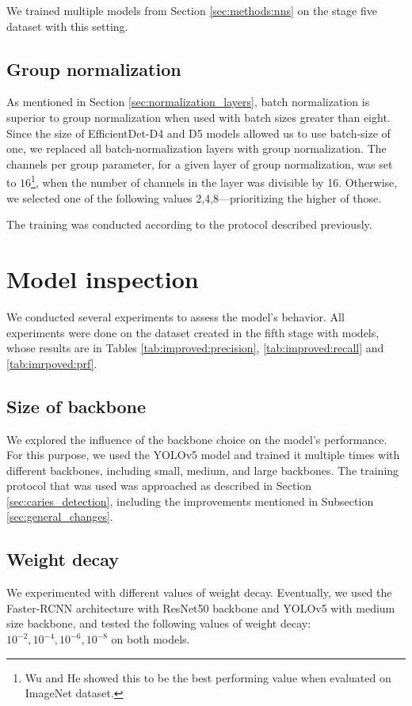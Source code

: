 We trained multiple models from Section \ref{sec:methods:nns} on the stage five dataset with this setting.

\subsection{Group normalization}
\label{sec:methods:group_norm}
As mentioned in Section \ref{sec:normalization_layers}, batch normalization is superior to group normalization when used with batch sizes greater than eight. Since the size of EfficientDet-D4 and D5  models allowed us to use batch-size of one, we replaced all batch-normalization layers with group normalization. The channels per group parameter, for a given layer of group normalization, was set to $16$\footnote{Wu and He \cite{Wu2018} showed this to be the best performing value when evaluated on ImageNet dataset.}, when the number of channels in the layer was divisible by 16. Otherwise, we selected one of the following values 2,4,8—prioritizing the higher of those.

The training was conducted according to the protocol described previously.


\section{Model inspection}
\label{sec:model_inspection}
We conducted several experiments to assess the model's behavior. All experiments were done on the dataset created in the fifth stage with models, whose results are in Tables \ref{tab:improved:precision}, \ref{tab:improved:recall} and \ref{tab:imrpoved:prf}.

\subsection{Size of backbone}
We explored the influence of the backbone choice on the model's performance. For this purpose, we used the YOLOv5 model and trained it multiple times with different backbones, including small, medium, and large backbones. The training protocol that was used was approached as described in Section \ref{sec:caries_detection}, including the improvements mentioned in Subsection \ref{sec:general_changes}.

\subsection{Weight decay}
We experimented with different values of weight decay. Eventually, we used the Faster-RCNN architecture with ResNet50 backbone and YOLOv5 with medium size backbone, and tested the following values of weight decay: $10^{-2}, 10^{-4}, 10^{-6}, 10^{-8}$ on both models.



